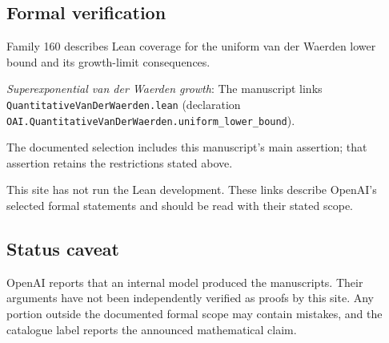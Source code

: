 \documentclass[11pt]{article}
\begin{document}
\subsection{Formal verification}
Family 160 describes Lean coverage for the uniform van der Waerden lower bound and its growth-limit consequences.

\textit{Superexponential van der Waerden growth}: The manuscript links \texttt{QuantitativeVanDerWaerden.lean} (declaration \texttt{OAI.QuantitativeVanDerWaerden.uniform\_lower\_bound}).

The documented selection includes this manuscript’s main assertion; that assertion retains the restrictions stated above.

This site has not run the Lean development. These links describe OpenAI’s selected formal statements and should be read with their stated scope.

\subsection{Status caveat}
OpenAI reports that an internal model produced the manuscripts. Their arguments have not been independently verified as proofs by this site. Any portion outside the documented formal scope may contain mistakes, and the catalogue label reports the announced mathematical claim.
\end{document}
